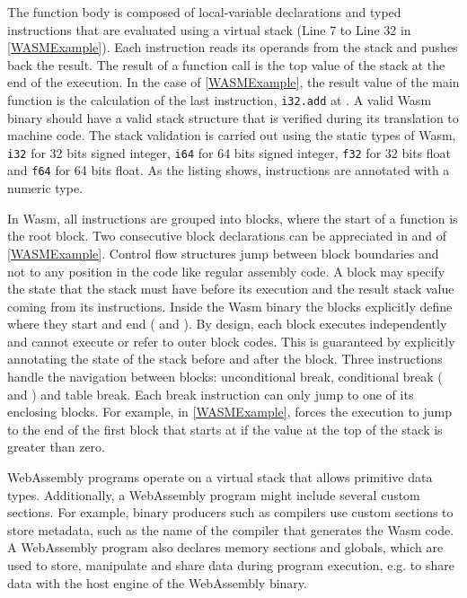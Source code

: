 The function body is composed of local-variable declarations and typed instructions that are evaluated using a virtual stack (Line 7 to Line 32 in \autoref{WASMExample}). Each instruction reads its operands from the stack and pushes back the result. The result of a function call is the top value of the stack at the end of the execution. In the case of \autoref{WASMExample}, the result value of the main function is the calculation of the last instruction, \texttt{i32.add} at . A valid Wasm  binary should have a valid stack structure that is verified during its translation to machine code. The stack validation is carried out using the static types of Wasm, \texttt{i32} for 32 bits signed integer, \texttt{i64} for 64 bits signed integer, \texttt{f32} for 32 bits float and \texttt{f64} for 64 bits float. As the listing shows, instructions are annotated with a numeric type.

In Wasm, all instructions are grouped into blocks, where the start of a function is the root block. Two consecutive block declarations can be appreciated in  and  of \autoref{WASMExample}. Control flow structures jump between block boundaries and not to any position in the code like regular assembly code. A block may specify the state that the stack must have before its execution and the result stack value coming from its instructions. Inside the Wasm  binary the blocks explicitly define where they start and end ( and ). By design, each block executes independently and cannot execute or refer to outer block codes. This is guaranteed by explicitly annotating the state of the stack before and after the block. Three instructions handle the navigation between blocks: unconditional break, conditional break ( and ) and table break. Each break instruction can only jump to one of its enclosing blocks. For example, in \autoref{WASMExample},  forces the execution to jump to the end of the first block that starts at  if the value at the top of the stack is greater than zero.





WebAssembly programs operate on a virtual stack that allows primitive data types.
Additionally, a WebAssembly program might include several custom sections.
For example, binary producers such as compilers use custom sections to store metadata, such as the name of the compiler that generates the Wasm code.
A WebAssembly program also declares memory sections and globals, which are used to store, manipulate and share data during program execution, e.g. to share data with the host engine of the WebAssembly binary.

